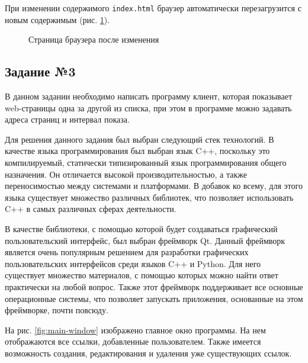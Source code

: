 \documentclass[a4paper, 14pt]{extarticle}
\begin{document}
При изменении содержимого \texttt{index.html} браузер автоматически
перезагрузится с новым содержимым (рис. \ref{fig:browser-after}).

\begin{figure}[H]
  \centering
  \caption{Страница браузера после изменения}
  \label{fig:browser-after}
\end{figure}

\subsection*{Задание №3}

В данном задании необходимо написать программу клиент, которая показывает
web-страницы одна за другой из списка, при этом в программе можно задавать
адреса страниц и интервал показа.

Для решения данного задания был выбран следующий стек технологий. В качестве
языка программирования был выбран язык C++, поскольку это компилируемый,
статически типизированный язык программирования общего назначения. Он отличается
высокой производительностью, а также переносимостью между системами и
платформами. В добавок ко всему, для этого языка существует множество различных
библиотек, что позволяет использовать C++ в самых различных сферах деятельности.

В качестве библиотеки, с помощью которой будет создаваться графический
пользовательский интерфейс, был выбран фреймворк Qt. Данный фреймворк является
очень популярным решением для разработки графических пользовательских
интерфейсов среди языков C++ и Python. Для него существует множество материалов,
с помощью которых можно найти ответ практически на любой вопрос. Также этот
фреймворк поддерживает все основные операционные системы, что позволяет
запускать приложения, основанные на этом фреймворке, почти повсюду.

На рис. \ref{fig:main-window} изображено главное окно программы. На нем
отображаются все ссылки, добавленные пользователем. Также имеется возможность
создания, редактирования и удаления уже существующих ссылок.
\end{document}
